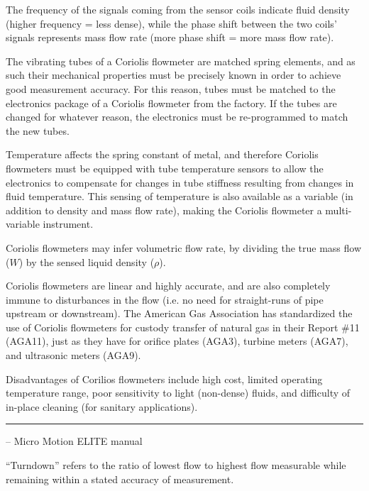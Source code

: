 The frequency of the signals coming from the sensor coils indicate fluid density (higher frequency = less dense), while the phase shift between the two coils' signals represents mass flow rate (more phase shift = more mass flow rate).

\vskip 10pt

The vibrating tubes of a Coriolis flowmeter are matched spring elements, and as such their mechanical properties must be precisely known in order to achieve good measurement accuracy.  For this reason, tubes must be matched to the electronics package of a Coriolis flowmeter from the factory.  If the tubes are changed for whatever reason, the electronics must be re-programmed to match the new tubes.

Temperature affects the spring constant of metal, and therefore Coriolis flowmeters must be equipped with tube temperature sensors to allow the electronics to compensate for changes in tube stiffness resulting from changes in fluid temperature.  This sensing of temperature is also available as a variable (in addition to density and mass flow rate), making the Coriolis flowmeter a multi-variable instrument.

\vskip 10pt

Coriolis flowmeters may infer volumetric flow rate, by dividing the true mass flow ($W$) by the sensed liquid density ($\rho$).

\vskip 10pt

Coriolis flowmeters are linear and highly accurate, and are also completely immune to disturbances in the flow (i.e. no need for straight-runs of pipe upstream or downstream).  The American Gas Association has standardized the use of Coriolis flowmeters for custody transfer of natural gas in their Report \#11 (AGA11), just as they have for orifice plates (AGA3), turbine meters (AGA7), and ultrasonic meters (AGA9).

\vskip 10pt

Disadvantages of Corilios flowmeters include high cost, limited operating temperature range, poor sensitivity to light (non-dense) fluids, and difficulty of in-place cleaning (for sanitary applications).


\filbreak \vskip 5pt \hrule \vskip 5pt  -- Micro Motion ELITE manual \vskip 10pt

``Turndown'' refers to the ratio of lowest flow to highest flow measurable while remaining within a stated accuracy of measurement.

